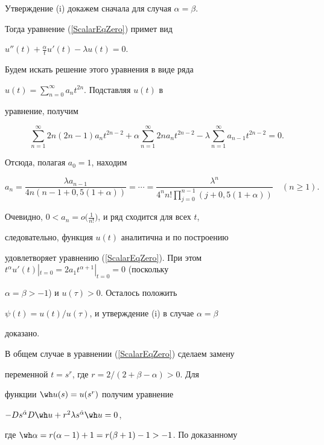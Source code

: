 \begin{pf}


Утверждение (i) докажем сначала для случая $\alpha=\beta$.


Тогда уравнение (\ref{ScalarEqZero}) примет вид


$u''(t)+\frac{\alpha}{t} u'(t)-\lambda u(t)=0$.


Будем искать решение этого уравнения в виде ряда


$u(t)=\sum\limits_{n=0}^\infty a_nt^{2n}$. Подставляя $u(t)$ в


уравнение, получим


$$


\sum_{n=1}^\infty 2n(2n-1)a_nt^{2n-2}+


\alpha\sum_{n=1}^\infty 2na_nt^{2n-2} -


\lambda \sum_{n=1}^\infty a_{n-1}t^{2n-2}=0.


$$


Отсюда, полагая $a_0=1$, находим


$$


a_n=\frac{\lambda a_{n-1}}{4n(n-1+0{,}5(1+\alpha))}=\dotsb= 


\frac{\lambda^n}{4^n n!


\prod\limits_{j=0}^{n-1}(j+0{,}5(1+\alpha))} \quad (n \ge 1).


$$


Очевидно, $0 < a_n=o\big(\frac{1}{n!}\big)$, и ряд сходится для всех $t$,


следовательно, функция $u(t)$ аналитична и по построению


удовлетворяет уравнению (\ref{ScalarEqZero}). При этом $t^\alpha


u'(t)|_{t=0}=2 a_1 t^{\alpha+1}|_{t=0}=0$ (поскольку


$\alpha=\beta>-1$) и $u(\tau)>0$. Осталось положить


$\psi(t)=u(t)/u(\tau)$, и утверждение (i) в случае $\alpha=\beta$


доказано.





В общем случае в уравнении (\ref{ScalarEqZero}) сделаем замену


переменной $t=s^r$, где $r=2/(2+\beta-\alpha)>0$. Для


функции $\wh u(s)=u(s^r)$ получим уравнение 


$-Ds^{\Hat\alpha} D\wh u + r^2\lambda s^{\Hat\alpha} \wh u =0$,


где $\wh\alpha=r(\alpha-1)+1=r(\beta+1)-1 > -1$. По доказанному



\end{pf}
